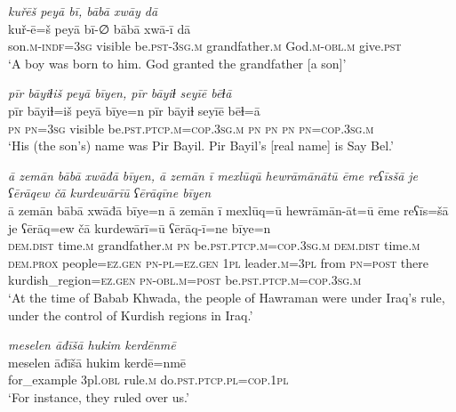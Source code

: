 \ea \label{BP.4}
\textit{kuřēš peyā bī, bābā xwāy dā} \\ 
\gll kuř-ē=š peyā bī-∅ bābā xwā-ī dā \\ 
 son\textsc{.m}\textsc{-indf}\textsc{=3sg} visible be\textsc{.pst}\textsc{-3sg}\textsc{.m} grandfather\textsc{.m} God\textsc{.m}\textsc{-obl}\textsc{.m} give\textsc{.pst} \\ 
\glt `A boy  was born to him. God granted the grandfather [a son]'
\z 
 
\ea \label{BP.5}
\textit{pīr bāyiɫiš peyā bīyen, pīr bāyiɫ seyīē bēɫā} \\ 
\gll pīr bāyiɫ=iš peyā bīye=n pīr bāyiɫ seyīē bēɫ=ā \\ 
 \textsc{pn} \textsc{pn}\textsc{=3sg} visible be\textsc{.pst}\textsc{.ptcp}\textsc{.m}\textsc{=cop}\textsc{.3sg}\textsc{.m} \textsc{pn} \textsc{pn} \textsc{pn} \textsc{pn}\textsc{=cop}\textsc{.3sg}\textsc{.m} \\ 
\glt `His (the son’s) name was Pir Bayil. Pir Bayil’s [real name] is Say Bel.'
\z 
 
\ea \label{BP.9}
\textit{ā zemān bābā xwāđā bīyen, ā zemān ī mexlūqū hewrāmānātū ēme reʕīsšā je ʕērāqew čā kurdewārīū ʕērāqīne bīyen} \\ 
\gll ā zemān bābā xwāđā bīye=n ā zemān ī mexlūq=ū hewrāmān-āt=ū ēme reʕīs=šā je ʕērāq=ew čā kurdewārī=ū ʕērāq-ī=ne bīye=n \\ 
 \textsc{dem.dist} time\textsc{.m} grandfather\textsc{.m} \textsc{pn} be\textsc{.pst}\textsc{.ptcp}\textsc{.m}\textsc{=cop}\textsc{.3sg}\textsc{.m} \textsc{dem.dist} time\textsc{.m} \textsc{dem.prox} people\textsc{=ez.gen} \textsc{pn}\textsc{\textsc{-pl}}\textsc{=ez.gen} \textsc{1pl} leader\textsc{.m}\textsc{=3pl} from \textsc{pn}\textsc{=\textsc{post}} there kurdish\_region\textsc{=ez.gen} \textsc{pn}\textsc{-obl}\textsc{.m}\textsc{=\textsc{post}} be\textsc{.pst}\textsc{.ptcp}\textsc{.m}\textsc{=cop}\textsc{.3sg}\textsc{.m} \\ 
\glt `At the time of Babab Khwada, the people of Hawraman were under Iraq’s rule, under the control of Kurdish regions in Iraq.'
\z 
 
\ea \label{BP.10}
\textit{meselen āđīšā hukim kerdēnmē} \\ 
\gll meselen āđīšā hukim kerdē=nmē \\ 
 for\_example 3pl\textsc{.obl} rule\textsc{.m} do\textsc{.pst}\textsc{.ptcp}\textsc{.pl}\textsc{=cop}\textsc{.\textsc{1pl}} \\ 
\glt `For instance, they ruled over us.'
\z 
 
